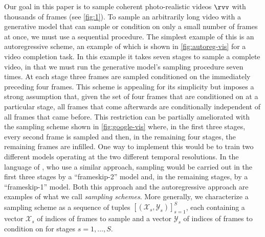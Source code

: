 Our goal in this paper is to sample coherent photo-realistic videos $\rvv$ with thousands of frames (see \cref{fig:1}). 
%
%
To sample an arbitrarily long video with a generative model that can sample or condition on only a small number of frames at once, we must use a sequential procedure. The simplest example of this is an autoregressive scheme, an example of which is shown in \cref{fig:autoreg-vis} for a video completion task. 
%
In this example it takes seven stages to sample a complete video, in that we must run the generative model's sampling procedure seven times. 
%
At each stage three frames are sampled conditioned on the immediately preceding four frames. This scheme is appealing for its simplicity but imposes a strong assumption that, given the set of four frames that are conditioned on at a particular stage, all frames that come afterwards are conditionally independent of all frames that came before. This restriction can be partially ameliorated with the sampling scheme shown in \cref{fig:google-vis} where, in the first three stages, every second frame is sampled and then, in the remaining four stages, the remaining frames are infilled. One way to implement this would be to train two different models operating at the two different temporal resolutions. 
%
In the language of \citet{ho2022video}, who use a similar approach, sampling would be carried out in the first three stages by a ``frameskip-2'' model and, in the remaining stages, by a ``frameskip-1'' model. Both this approach and the autoregressive approach are examples of what we call \textit{sampling schemes}.
%
More generally, we characterize a sampling scheme as a sequence of tuples $[(\mathcal{X}_s, \mathcal{Y}_s)]_{s=1}^S$, each containing a vector $\mathcal{X}_s$ of indices of frames to sample and a vector $\mathcal{Y}_s$ of indices of frames to condition on for stages $s = 1,\ldots,S$. 

